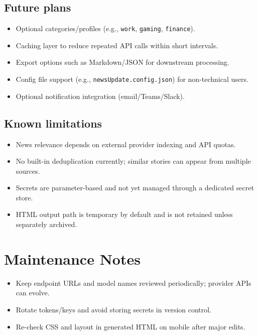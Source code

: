\documentclass[11pt,a4paper]{article}
\begin{document}
\subsection{Future plans}
\begin{itemize}
  \item Optional categories/profiles (e.g., \texttt{work}, \texttt{gaming}, \texttt{finance}).
  \item Caching layer to reduce repeated API calls within short intervals.
  \item Export options such as Markdown/JSON for downstream processing.
  \item Config file support (e.g., \texttt{newsUpdate.config.json}) for non-technical users.
  \item Optional notification integration (email/Teams/Slack).
\end{itemize}

\subsection{Known limitations}
\begin{itemize}
  \item News relevance depends on external provider indexing and API quotas.
  \item No built-in deduplication currently; similar stories can appear from multiple sources.
  \item Secrets are parameter-based and not yet managed through a dedicated secret store.
  \item HTML output path is temporary by default and is not retained unless separately archived.
\end{itemize}

\section{Maintenance Notes}
\begin{itemize}
  \item Keep endpoint URLs and model names reviewed periodically; provider APIs can evolve.
  \item Rotate tokens/keys and avoid storing secrets in version control.
  \item Re-check CSS and layout in generated HTML on mobile after major edits.
\end{itemize}
\end{document}
